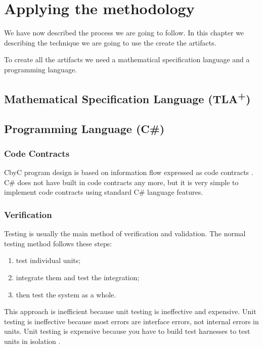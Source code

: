 
\chapter{Applying the methodology} %

\label{Chapter_Applying_the_methodology} %

We have now described the process we are going to follow. In this chapter we
describing the technique we are going to use the create the artifacts.

To create all the artifacts we need a mathematical specification language
and a programming language.

\section{Mathematical Specification Language (TLA\textsuperscript{+})}

\section{Programming Language (C\#)}

\subsection{Code Contracts}

CbyC program design is based on information flow expressed as code contracts 
\parencite{CbyCMan}. C\# does not have built in code contracts any more, but it
is very simple to implement code contracts using standard C\# language features.


\subsection{Verification}
Testing is usually the main method of verification and validation. The normal testing
method follows these steps:
\begin{enumerate}
	\item test individual units; 
	\item integrate them and test the integration; 
	\item then test the system as a whole. 
\end{enumerate}
This approach is inefficient because unit testing is ineffective and expensive. 
Unit testing is ineffective because most errors are interface errors, not internal
errors in units. Unit testing is expensive because you have to build test 
harnesses to test units in isolation \parencite{CbyCPraxis}.

